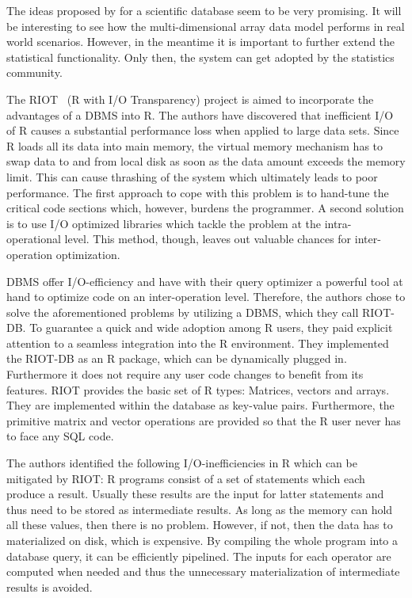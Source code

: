 The ideas proposed by \citeauthor{stonebraker:2009a} for a scientific database seem to be very promising.
It will be interesting to see how the multi-dimensional array data model performs in real world scenarios.
However, in the meantime it is important to further extend the statistical functionality.
Only then, the system can get adopted by the statistics community.

The RIOT~\cite{zhang:apa2009a} (R with I/O Transparency) project is aimed to incorporate the advantages of a DBMS into R.
The authors \citeauthor{zhang:apa2009a} have discovered that inefficient I/O of R causes a substantial performance loss when applied to large data sets.
Since R loads all its data into main memory, the virtual memory mechanism has to swap data to and from local disk as soon as the data amount exceeds the memory limit.
This can cause thrashing of the system which ultimately leads to poor performance.
The first approach to cope with this problem is to hand-tune the critical code sections which, however, burdens the programmer.
A second solution is to use I/O optimized libraries which tackle the problem at the intra-operational level.
This method, though, leaves out valuable chances for inter-operation optimization.

DBMS offer I/O-efficiency and have with their query optimizer a powerful tool at hand to optimize code on an inter-operation level.
Therefore, the authors chose to solve the aforementioned problems by utilizing a DBMS, which they call RIOT-DB.
To guarantee a quick and wide adoption among R users, they paid explicit attention to a seamless integration into the R environment.
They implemented the RIOT-DB as an R package, which can be dynamically plugged in.
Furthermore it does not require any user code changes to benefit from its features.
RIOT provides the basic set of R types: Matrices, vectors and arrays.
They are implemented within the database as key-value pairs.
Furthermore, the primitive matrix and vector operations are provided so that the R user never has to face any SQL code.

The authors identified the following I/O-inefficiencies in R which can be mitigated by RIOT:
R programs consist of a set of statements which each produce a result.
Usually these results are the input for latter statements and thus need to be stored as intermediate results.
As long as the memory can hold all these values, then there is no problem.
However, if not, then the data has to materialized on disk, which is expensive.
By compiling the whole program into a database query, it can be efficiently pipelined.
The inputs for each operator are computed when needed and thus the unnecessary materialization of intermediate results is avoided.

